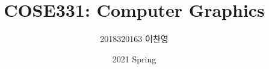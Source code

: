 

\title{COSE331: Computer Graphics}
\author{2018320163 이찬영}
\date{2021 Spring}


    \maketitle
    \tableofcontents

